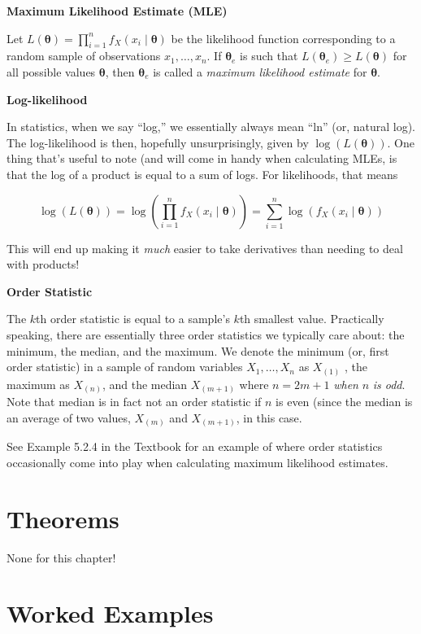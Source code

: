 \documentclass[
  letterpaper,
  DIV=11,
  numbers=noendperiod]{scrreprt}
\begin{document}
\textbf{Maximum Likelihood Estimate (MLE)}

Let
\(L(\boldsymbol{\theta}) = \prod_{i = 1}^n f_X(x_i \mid \boldsymbol{\theta})\)
be the likelihood function corresponding to a random sample of
observations \(x_1, \dots, x_n\). If \(\boldsymbol{\theta}_e\) is such
that \(L(\boldsymbol{\theta}_e) \geq L(\boldsymbol{\theta})\) for all
possible values \(\boldsymbol{\theta}\), then \(\boldsymbol{\theta}_e\)
is called a \emph{maximum likelihood estimate} for
\(\boldsymbol{\theta}\).

\textbf{Log-likelihood}

In statistics, when we say ``log,'' we essentially always mean ``ln''
(or, natural log). The log-likelihood is then, hopefully unsurprisingly,
given by \(\log(L(\boldsymbol{\theta}))\). One thing that's useful to
note (and will come in handy when calculating MLEs, is that the log of a
product is equal to a sum of logs. For likelihoods, that means

\[
\log(L(\boldsymbol{\theta})) = \log \left(\prod_{i = 1}^n f_X(x_i \mid \boldsymbol{\theta})\right) = \sum_{i = 1}^n \log(f_X(x_i \mid \boldsymbol{\theta}))
\]

This will end up making it \emph{much} easier to take derivatives than
needing to deal with products!

\textbf{Order Statistic}

The \(k\)th order statistic is equal to a sample's \(k\)th smallest
value. Practically speaking, there are essentially three order
statistics we typically care about: the minimum, the median, and the
maximum. We denote the minimum (or, first order statistic) in a sample
of random variables \(X_1, \dots, X_n\) as \(X_{(1)}\) , the maximum as
\(X_{(n)}\), and the median \(X_{(m+1)}\) where \(n = 2m + 1\)
\emph{when} \(n\) \emph{is odd}. Note that median is in fact not an
order statistic if \(n\) is even (since the median is an average of two
values, \(X_{(m)}\) and \(X_{(m+1)}\), in this case.

See Example 5.2.4 in the Textbook for an example of where order
statistics occasionally come into play when calculating maximum
likelihood estimates.

\hypertarget{theorems-1}{%
\section{Theorems}\label{theorems-1}}

None for this chapter!

\hypertarget{worked-examples-1}{%
\section{Worked Examples}\label{worked-examples-1}}
\end{document}

